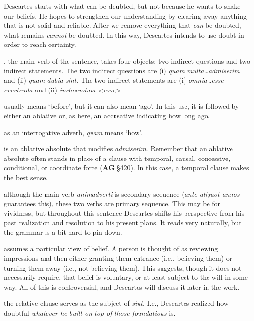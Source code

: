 \prenotes

Descartes starts with what can be doubted, but not because he wants to shake our beliefs. He hopes to strengthen our understanding by clearing away anything that is not solid and reliable. After we remove everything that \textit{can} be doubted, what remains \textit{cannot} be doubted. In this way, Descartes intends to use doubt in order to reach certainty.

, the main verb of the sentence, takes four objects: two indirect questions and two indirect statements. The two indirect questions are (i) \textit{quam multa\dots admiserim} and (ii) \textit{quam dubia sint}. The two indirect statements are (i) \textit{omnia\dots esse evertenda} and (ii) \textit{inchoandum <esse>}.

 usually means `before', but it can also mean `ago'. In this use, it is followed by either an ablative or, as here, an accusative indicating how long ago.

 as an interrogative adverb, \textit{quam} means `how'.

 is an ablative absolute that modifies \textit{admiserim}. Remember that an ablative absolute often stands in place of a clause with temporal, causal, concessive, conditional, or coordinate force (\textbf{AG} §420). In this case, a temporal clause makes the best sense.

 although the main verb \textit{animadverti} is secondary sequence (\textit{ante aliquot annos} guarantees this), these two verbs are primary sequence. This may be for vividness, but throughout this sentence Descartes shifts his perspective from his past realization and resolution to his present plans. It reads very naturally, but the grammar is a bit hard to pin down.

 assumes a particular view of belief. A person is thought of as reviewing impressions and then either granting them entrance (i.e., believing them) or turning them away (i.e., not believing them). This suggests, though it does not necessarily require, that belief is voluntary, or at least subject to the will in some way. All of this is controversial, and Descartes will discuss it later in the work.

 the relative clause serves as the subject of \textit{sint}. I.e., Descartes realized how doubtful \textit{whatever he built on top of those foundations} is.

